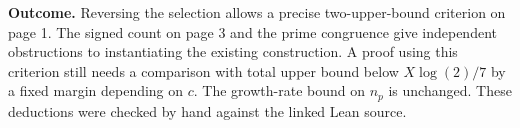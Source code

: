 \documentclass[11pt]{article}
\begin{document}
\textbf{Outcome.}
Reversing the selection allows a precise two-upper-bound criterion on page 1. The signed count on page 3 and the prime congruence give independent obstructions to instantiating the existing construction. A proof using this criterion still needs a comparison with total upper bound below $X\log(2)/7$ by a fixed margin depending on $c$. The growth-rate bound on $n_p$ is unchanged. These deductions were checked by hand against the linked Lean source.
\end{document}
